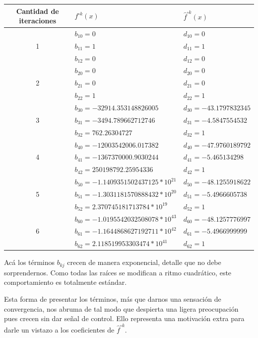 \documentclass[oneside,11pt]{book}
\theoremstyle{definition}
\theoremstyle{plain}
\theoremstyle{remark}
\begin{document}
\begin{center}
\begin{tabular}{ |c | l | l | }
\hline
 Cantidad de iteraciones & $f^{\circ k}(x)$ & $\hat{f}^{\circ k}(x)$\\
 \hline 
& $b_{10}= 0$ & $d_{10}= 0 $\\
1 & $b_{11}= 1$ &$d_{11}=1 $  \\ 
& $b_{12}= 0$ & $d_{12}=0$\\  
 \hline 
& $b_{20}= 0$ & $d_{20}= 0 $\\
2 & $b_{21}= 0$ & $d_{21}=0 $  \\ 
& $b_{22}= 1$ & $d_{22}=1$\\
\hline
& $b_{30}= -32914.353148826005$ & $d_{30}= -43.1797832345 $\\
3 & $b_{31}= -3494.789662712746$ & $d_{31}=-4.5847554532 $  \\ 
& $b_{32}= 762.26304727$ & $d_{32}=1$\\
\hline
& $b_{40}= -12003542006.017382$ & $d_{40}= -47.9760189792 $\\
4 & $b_{41}= -1367370000.9030244$ & $d_{41}=-5.465134298 $  \\ 
& $b_{42}= 250198792.25954336$ & $d_{42}=1$\\
\hline
& $b_{50}= -1.1409351502437125*10^{21}$ & $d_{50}= -48.1255918622 $\\
5 & $b_{51}= -1.3031181570888432*10^{20}$ & $d_{51}=-5.4966605738 $  \\ 
& $b_{52}= 2.370745181713784*10^{19}$ & $d_{52}=1$\\
\hline
& $b_{60}= -1.0195542032508078*10^{43}$ & $d_{60}= -48.1257776997 $\\
6 & $b_{61}= -1.1644868627192711*10^{42}$ & $d_{61}=-5.4966999999 $  \\  
& $b_{62}= 2.118519953303474*10^{41}$ & $d_{62}=1$\\
\hline
\end{tabular}
\end{center}
\bigskip

Ac\'a los t\'erminos $b_{kj}$ crecen de manera exponencial, detalle que no debe sorprendernos. 
Como todas las ra\'ices se modifican a ritmo cuadr\'atico,
este comportamiento es totalmente est\'andar. 

Esta forma de presentar los t\'erminos, 
m\'as que darnos una sensaci\'on de convergencia, 
nos abruma de tal modo que despierta una ligera preocupaci\'on pues crecen sin dar señal de control.
Ello representa una motivaci\'on extra para darle un vistazo a los coeficientes de $\hat{f}^{\circ k}$.
\end{document}
